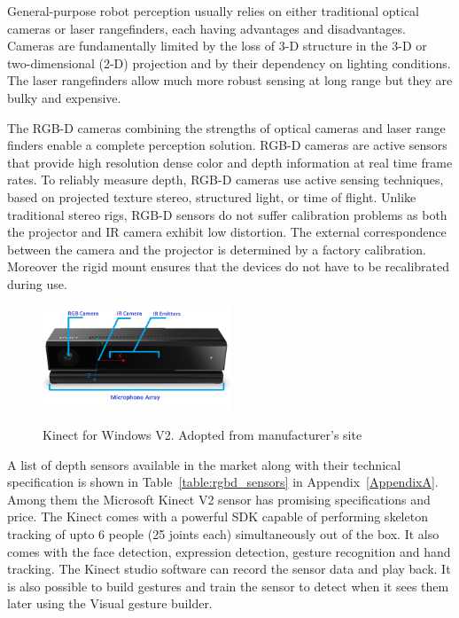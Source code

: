 General-purpose robot perception usually relies on either traditional optical cameras or laser rangefinders, each having advantages and disadvantages. Cameras are fundamentally limited by the loss of 3-D structure in the 3-D or two-dimensional (2-D) projection and by their dependency on lighting conditions. The laser rangefinders allow much more robust sensing at long range but they are bulky and expensive.  

The RGB-D cameras combining the strengths of optical cameras and laser range finders enable a complete perception solution. RGB-D cameras\cite{ren2013change} are active sensors that provide high resolution dense color and depth information at real time frame rates. To reliably measure depth, RGB-D cameras use active sensing techniques, based on projected texture stereo, structured light, or time of flight. Unlike traditional stereo rigs, RGB-D sensors do not suffer calibration problems as both the projector and IR camera exhibit low distortion. The external correspondence between the camera and the projector is determined by a factory calibration. Moreover the rigid mount ensures that the devices do not have to be recalibrated during use.
\begin{figure}[H]
\centering
\includegraphics[width=0.5\textwidth]{assets/kinectv2_parts.png}
\label{fig:kinectv2}
\caption[Kinect for Windows V2]{Kinect for Windows V2. {Adopted from manufacturer's site}}
\end{figure}

A list of depth sensors available in the market along with their technical specification is shown in Table~\ref{table:rgbd_sensors} in Appendix~\ref{AppendixA}. Among them the Microsoft Kinect V2 \cite{Kinect2014} sensor has promising specifications and price. The Kinect comes with a powerful SDK \cite{KinectSDK2014} capable of performing skeleton tracking of upto 6 people (25 joints each) simultaneously out of the box. It also comes with the face detection, expression detection, gesture recognition and hand tracking. The Kinect studio software can record the sensor data and play back. It is also possible to build gestures and train the sensor to detect when it sees them later using the Visual gesture builder. 

